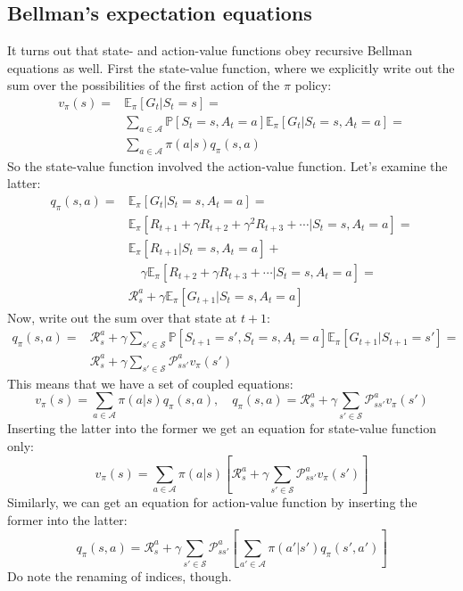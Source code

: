 \documentclass[12pt, a4paper]{article}
\numberwithin{equation}{section}
\begin{document}
\subsection{Bellman's expectation equations}
It turns out that state- and action-value functions obey recursive Bellman equations as well. First the state-value function, where we explicitly write out the sum over the possibilities of the first action of the $\pi$ policy:
\begin{align}
v_\pi(s)=&\mathbb{E}_\pi[G_t|S_t=s]=\\
&\sum_{a\in\mathcal{A}}\mathbb{P}[S_t=s,A_t=a]\mathbb{E}_\pi[G_t|S_t=s,A_t=a]=\\
&\sum_{a\in\mathcal{A}}\pi(a|s)q_\pi(s,a)
\end{align} 
So the state-value function involved the action-value function. Let's examine the latter:
\begin{align}
q_\pi(s,a)=&\mathbb{E}_\pi[G_t|S_t=s, A_t=a]=\\
&\mathbb{E}_\pi[R_{t+1}+\gamma R_{t+2}+\gamma^2 R_{t+3}+\cdots|S_t=s, A_t=a]=\\
&\mathbb{E}_\pi[R_{t+1}|S_t=s, A_t=a]+\\
&\quad\gamma\mathbb{E}_\pi[R_{t+2}+\gamma R_{t+3}+\cdots|S_t=s, A_t=a]=\\
&\mathcal{R}^a_s+\gamma\mathbb{E}_\pi[G_{t+1}|S_t=s, A_t=a]
\end{align}
Now, write out the sum over that state at $t+1$:
\begin{align}
q_\pi(s,a)=&\mathcal{R}^a_s+\gamma\sum_{s'\in\mathcal{S}}\mathbb{P}[S_{t+1}=s',S_t=s,A_t=a]\mathbb{E}_\pi[G_{t+1}|S_{t+1}=s']=\\
&\mathcal{R}^a_s+\gamma\sum_{s'\in\mathcal{S}}\mathcal{P}^a_{ss'}v_\pi(s')
\end{align}
This means that we have a set of coupled equations:
\begin{equation}
v_\pi(s)=\sum_{a\in\mathcal{A}}\pi(a|s)q_\pi(s,a),\quad
q_\pi(s,a)=\mathcal{R}^a_s+\gamma\sum_{s'\in\mathcal{S}}\mathcal{P}^a_{ss'}v_\pi(s')
\label{expectation_equations}
\end{equation}
Inserting the latter into the former we get an equation for state-value function only:
\begin{equation}
v_\pi(s)=\sum_{a\in\mathcal{A}}\pi(a|s)\left[\mathcal{R}^a_s+\gamma\sum_{s'\in\mathcal{S}}\mathcal{P}^a_{ss'}v_\pi(s')\right]
\label{expectation_state}
\end{equation}
Similarly, we can get an equation for action-value function by inserting the former into the latter:
\begin{equation}
q_\pi(s,a)=\mathcal{R}^a_s+\gamma\sum_{s'\in\mathcal{S}}\mathcal{P}^a_{ss'}\left[\sum_{a'\in\mathcal{A}}\pi(a'|s')q_\pi(s',a')\right]
\label{expectation_action}
\end{equation}
Do note the renaming of indices, though.
\end{document}
